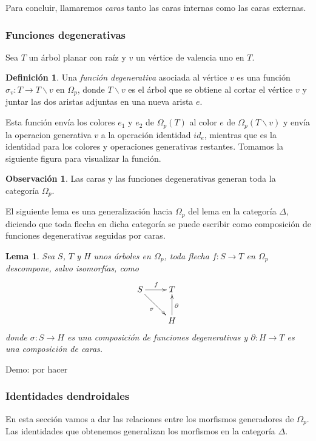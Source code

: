 \documentclass[11pt,a4paper,openright,oneside]{article}
\numberwithin{equation}{section}
\newtheorem{lema}[teo]{Lema}
\theoremstyle{definition}
\newtheorem{defi}[teo]{Definici\'on}
\newtheorem{obs}[teo]{Observaci\'on}
\begin{document}
Para concluir, llamaremos \emph{caras} tanto las caras internas como las caras externas.

\subsubsection{Funciones degenerativas}
Sea $T$ un \'arbol planar con ra\'iz y $v$ un v\'ertice de valencia uno en $T$.
\begin{defi}
    Una \emph{funci\'on degenerativa} asociada al v\'ertice $v$ es una funci\'on $\sigma_v\colon T\to T \backslash  v$ en $\Omega_p$, donde $T \backslash  v$ es el \'arbol que se obtiene al cortar el v\'ertice $v$ y juntar las dos aristas adjuntas en una nueva arista $e$.

    Esta funci\'on env\'ia los colores $e_1$ y $e_2$ de $\Omega_p(T)$ al color $e$ de $\Omega_p(T\backslash v)$ y env\'ia la operacion generativa $v$ a la operaci\'on identidad $id_e$, mientras que es la identidad para los colores y operaciones generativas restantes.
    Tomamos la siguiente figura para visualizar la funci\'on.
\end{defi}

\begin{obs}
    Las caras y las funciones degenerativas generan toda la categor\'ia $\Omega_p$.
\end{obs}
El siguiente lema es una generalizaci\'on hacia $\Omega_p$ del lema en la categor\'ia $\Delta$, diciendo que toda flecha en dicha categor\'ia se puede escribir como composici\'on de funciones degenerativas seguidas por caras.

\begin{lema}
    Sea $S$, $T$ y $H$ unos \'arboles en $\Omega_p$, toda flecha $f\colon S \to T$ en $\Omega_p$ descompone, salvo isomorf\'ias, como
    $$
        \xymatrix{
            S \ar[rd]_{\sigma} \ar[r]^f
            &T \\
            &H \ar[u]_\partial
        }
    $$
    donde  $\sigma\colon S\to H$ es una composici\'on de funciones degenerativas y $\partial\colon H\to T$ es una composici\'on de caras.
\end{lema}
Demo: por hacer

\subsubsection{Identidades dendroidales}
En esta secci\'on vamos a dar las relaciones entre los morfismos generadores de $\Omega_p$. Las identidades que obtenemos generalizan los morfismos en la categor\'ia $\Delta$.
\end{document}
